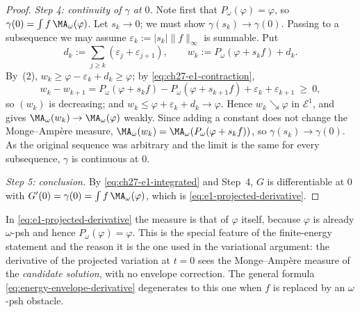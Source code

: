 \begin{proof}
\emph{Step 4: continuity of \(\gamma\) at \(0\).}
Note first that \(P_\omega(\varphi)=\varphi\), so
\(\gamma(0)=\int f\,\MA_\omega(\varphi)\).  Let \(s_k\to0\); we must show
\(\gamma(s_k)\to\gamma(0)\).  Passing to a subsequence we may assume
\(\varepsilon_k:=|s_k|\lVert f\rVert_\infty\) is summable.  Put
\[
 d_k:=\sum_{j\geq k}(\varepsilon_j+\varepsilon_{j+1}),
 \qquad
 w_k:=P_\omega(\varphi+s_kf)+d_k .
\]
By \,(2), \(w_k\geq
\varphi-\varepsilon_k+d_k\geq\varphi\); by
\eqref{eq:ch27-e1-contraction},
\[
 w_k-w_{k+1}
 =P_\omega(\varphi+s_kf)-P_\omega(\varphi+s_{k+1}f)
   +\varepsilon_k+\varepsilon_{k+1}\ \geq\ 0,
\]
so \((w_k)\) is decreasing; and \(w_k\leq\varphi+\varepsilon_k+d_k\to
\varphi\).  Hence \(w_k\searrow\varphi\) in \(\mathcal E^1\), and
 gives
\(\MA_\omega(w_k)\to\MA_\omega(\varphi)\) weakly.  Since adding a constant
does not change the Monge--Amp\`ere measure,
\(\MA_\omega(w_k)=\MA_\omega(P_\omega(\varphi+s_kf))\), so
\(\gamma(s_k)\to\gamma(0)\).  As the original sequence was arbitrary and the
limit is the same for every subsequence, \(\gamma\) is continuous at \(0\).

\emph{Step 5: conclusion.}
By \eqref{eq:ch27-e1-integrated} and Step~4, \(G\) is differentiable at
\(0\) with \(G'(0)=\gamma(0)=\int f\,\MA_\omega(\varphi)\), which is
\eqref{eq:e1-projected-derivative}.
\end{proof}

\begin{center}
\end{center}

\begin{remark}
\label{rem:ch27-e1-derivative-measure}
In \eqref{eq:e1-projected-derivative} the measure is that of \(\varphi\)
itself, because \(\varphi\) is already \(\omega\)-psh and hence
\(P_\omega(\varphi)=\varphi\).  This is the special feature of the
finite-energy statement and the reason it is the one used in the variational
argument: the derivative of the projected variation at \(t=0\) sees the
Monge--Amp\`ere measure of the \emph{candidate solution}, with no envelope
correction.  The general formula \eqref{eq:energy-envelope-derivative}
degenerates to this one when \(f\) is replaced by an \(\omega\)-psh
obstacle.
\end{remark}

